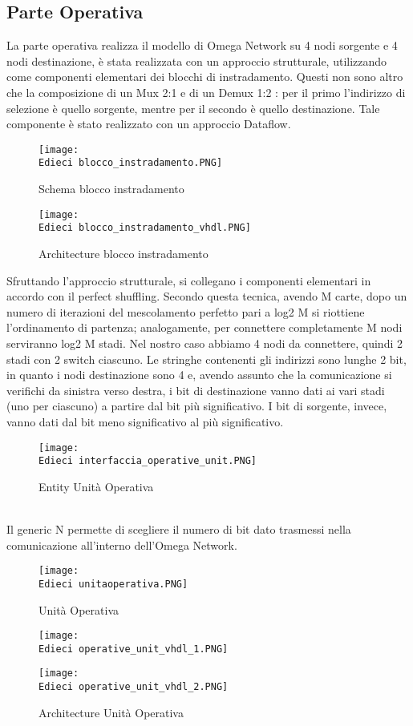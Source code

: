 \documentclass[12pt]{article}
\def \Edieci {Allegati/Esercizio10/}
\begin{document}
\subsection{Parte Operativa}
La parte operativa realizza il modello di Omega Network su 4 nodi sorgente e 4 nodi destinazione, è stata realizzata con un approccio strutturale, utilizzando come componenti elementari dei blocchi di instradamento. Questi non sono altro che la composizione di un Mux 2:1 e di un Demux 1:2 : per il primo l’indirizzo di selezione è quello sorgente, mentre per il secondo è quello destinazione. Tale componente è stato realizzato con un approccio Dataflow.
\begin{figure}[ht!]
    \centering
    \texttt{[image: \\Edieci blocco\_instradamento.PNG]}
    \caption{Schema blocco instradamento}
\end{figure}
\begin{figure}[ht!]
    \centering
    \texttt{[image: \\Edieci blocco\_instradamento\_vhdl.PNG]}
    \caption{Architecture blocco instradamento}
\end{figure}
\clearpage
Sfruttando l’approccio strutturale, si collegano i componenti elementari in accordo con il perfect shuffling. Secondo questa tecnica, avendo M carte, dopo un numero di iterazioni del mescolamento perfetto pari a log2 M si riottiene l’ordinamento di partenza; analogamente, per connettere completamente M nodi serviranno log2 M stadi. Nel nostro caso abbiamo 4 nodi da connettere, quindi 2 stadi con 2 switch ciascuno. Le stringhe contenenti gli indirizzi sono lunghe 2 bit, in quanto i nodi destinazione sono 4 e, avendo assunto che la comunicazione si verifichi da sinistra verso destra, i bit di destinazione vanno dati ai vari stadi (uno per ciascuno) a partire dal bit più significativo. I bit di sorgente, invece, vanno dati dal bit meno significativo al più significativo.
\begin{figure}[ht!]
    \centering
    \texttt{[image: \\Edieci interfaccia\_operative\_unit.PNG]}
    \caption{Entity Unità Operativa}
\end{figure}
\\Il generic N permette di scegliere il numero di bit dato trasmessi nella comunicazione all’interno dell’Omega Network.
\begin{figure}[ht!]
    \centering
    \texttt{[image: \\Edieci unitaoperativa.PNG]}
    \caption{Unità Operativa}
\end{figure}
\newpage
\begin{figure}[ht!]
    \centering
    \texttt{[image: \\Edieci operative\_unit\_vhdl\_1.PNG]}
\end{figure}
\begin{figure}[ht!]
    \centering
    \texttt{[image: \\Edieci operative\_unit\_vhdl\_2.PNG]}
    \caption{Architecture Unità Operativa}
\end{figure}
\clearpage
\end{document}
